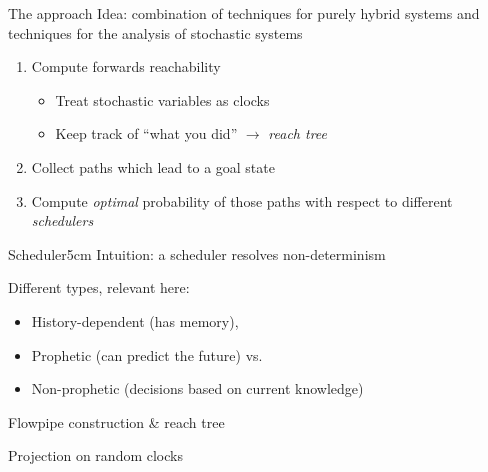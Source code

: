 \documentclass[aspectratio=169]{beamer}
\newcommand{\cb}[1]{\textcolor{blue100}{#1}\xspace}
\begin{document}

\begin{frame}{The approach}
  \cb{Idea:} combination of techniques for purely hybrid systems and techniques for the analysis of stochastic systems

  \begin{enumerate}
    \item Compute forwards reachability
    \begin{itemize}
      \item Treat stochastic variables as clocks
      \item Keep track of \enquote{what you did} $\rightarrow$ \emph{reach tree}
    \end{itemize}
    \item Collect paths which lead to a goal state
    \item Compute \emph{optimal} probability of those paths with respect to different \emph{schedulers}
  \end{enumerate}

  \begin{reminder}{Scheduler}{5cm}
    Intuition: a scheduler resolves non-determinism

    Different types, relevant here:
    \begin{itemize}
      \item History-dependent (has memory),
      \item Prophetic (can predict the future) vs.
      \item Non-prophetic (decisions based on current knowledge)
    \end{itemize}
  \end{reminder}
\end{frame}


\begin{frame}{Flowpipe construction \& reach tree}

\end{frame}


\begin{frame}{Projection on random clocks}

\end{frame}

\end{document}
